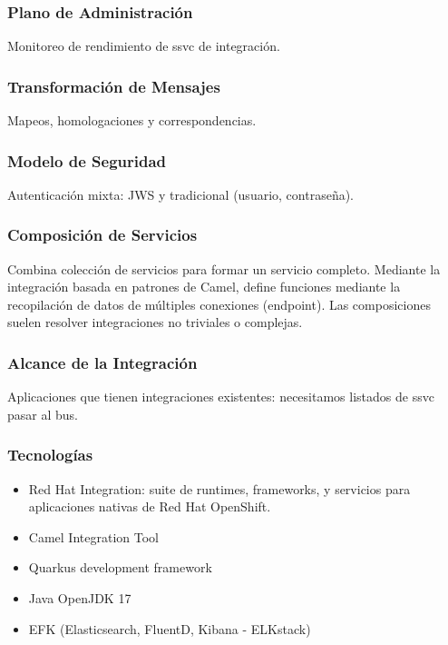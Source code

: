 \documentclass[
  paper=a4,
  ,captions=tableheading
]{scrartcl}
\providecommand{\tightlist}{%
  \setlength{\itemsep}{0pt}\setlength{\parskip}{0pt}}
\begin{document}
\subsubsection{Plano de
Administración}\label{sec:plano-de-administraciuxf3n}

Monitoreo de rendimiento de ssvc de integración.

\subsubsection{Transformación de
Mensajes}\label{sec:transformaciuxf3n-de-mensajes}

Mapeos, homologaciones y correspondencias.

\subsubsection{Modelo de Seguridad}\label{sec:modelo-de-seguridad}

Autenticación mixta: JWS y tradicional (usuario, contraseña).

\subsubsection{Composición de
Servicios}\label{sec:composiciuxf3n-de-servicios}

Combina colección de servicios para formar un servicio completo.
Mediante la integración basada en patrones de Camel, define funciones
mediante la recopilación de datos de múltiples conexiones (endpoint).
Las composiciones suelen resolver integraciones no triviales o
complejas.

\subsubsection{Alcance de la
Integración}\label{sec:alcance-de-la-integraciuxf3n}

Aplicaciones que tienen integraciones existentes: necesitamos listados
de ssvc pasar al bus.

\subsubsection{Tecnologías}\label{sec:tecnologuxedas}

\begin{itemize}
\tightlist
\item
  Red Hat Integration: suite de runtimes, frameworks, y servicios para
  aplicaciones nativas de Red Hat OpenShift.
\item
  Camel Integration Tool
\item
  Quarkus development framework
\item
  Java OpenJDK 17
\item
  EFK (Elasticsearch, FluentD, Kibana - ELKstack)
\end{itemize}
\end{document}
